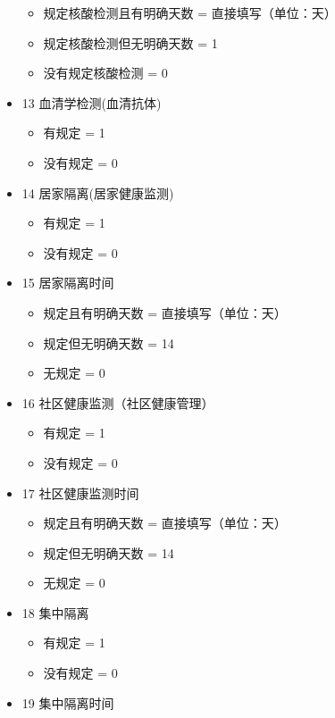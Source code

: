 \documentclass[
  12pt,
]{ctexart}
\providecommand{\tightlist}{%
  \setlength{\itemsep}{0pt}\setlength{\parskip}{0pt}}
\begin{document}
\begin{itemize}
  \begin{itemize}
  \tightlist
  \item
    规定核酸检测且有明确天数 = 直接填写（单位：天）
  \item
    规定核酸检测但无明确天数 = 1
  \item
    没有规定核酸检测 = 0
  \end{itemize}
\item
  13 血清学检测(血清抗体)

  \begin{itemize}
  \tightlist
  \item
    有规定 = 1
  \item
    没有规定 = 0
  \end{itemize}
\item
  14 居家隔离(居家健康监测)

  \begin{itemize}
  \tightlist
  \item
    有规定 = 1
  \item
    没有规定 = 0
  \end{itemize}
\item
  15 居家隔离时间

  \begin{itemize}
  \tightlist
  \item
    规定且有明确天数 = 直接填写（单位：天）
  \item
    规定但无明确天数 = 14
  \item
    无规定 = 0
  \end{itemize}
\item
  16 社区健康监测（社区健康管理）

  \begin{itemize}
  \tightlist
  \item
    有规定 = 1
  \item
    没有规定 = 0
  \end{itemize}
\item
  17 社区健康监测时间

  \begin{itemize}
  \tightlist
  \item
    规定且有明确天数 = 直接填写（单位：天）
  \item
    规定但无明确天数 = 14
  \item
    无规定 = 0
  \end{itemize}
\item
  18 集中隔离

  \begin{itemize}
  \tightlist
  \item
    有规定 = 1
  \item
    没有规定 = 0
  \end{itemize}
\item
  19 集中隔离时间


\end{itemize}
\end{document}
